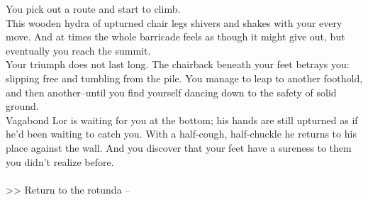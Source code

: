 You pick out a route and start to climb.\\

This wooden hydra of upturned chair legs shivers and shakes with your every move. And at times the whole barricade feels as though it might give out, but eventually you reach the summit.\\

Your triumph does not last long. The chairback beneath your feet betrays you: slipping free and tumbling from the pile. You manage to leap to another foothold, and then another--until you find yourself dancing down to the safety of solid ground.\\

Vagabond Lor is waiting for you at the bottom; his hands are still upturned as if he'd been waiting to catch you. With a half-cough, half-chuckle he returns to his place against the wall. And you discover that your feet have a sureness to them you didn't realize before.\\
\\

>> Return to the rotunda -- 